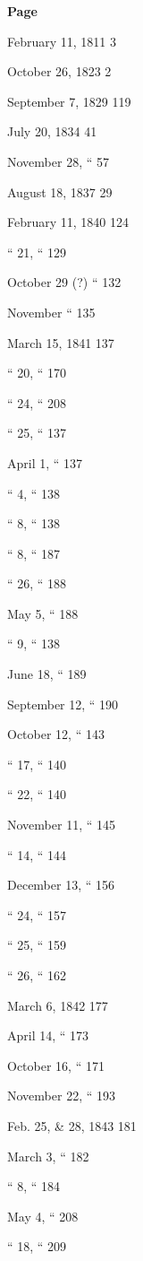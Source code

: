 

\textbf{Page}

February 11,
1811
3

October 26,
1823
2

September 7,
1829
119

July 20,
1834
41

November 28,
``
57

August 18,
1837
29

February 11,
1840
124

`` 21,
``
129

October 29 (?)
``
132

November
``
135

March 15,
1841
137

`` 20,
``
170

`` 24,
``
208

`` 25,
``
137

April 1,
``
137

`` 4,
``
138

`` 8,
``
138

`` 8,
``
187

`` 26,
``
188

May 5,
``
188

`` 9,
``
138

June 18,
``
189

September 12,
``
190

October 12,
``
143

`` 17,
``
140

`` 22,
``
140

November 11,
``
145

`` 14,
``
144

December 13,
``
156

`` 24,
``
157

`` 25,
``
159

`` 26,
``
162

March 6,
1842
177

April 14,
``
173

October 16,
``
171

November 22,
``
193

Feb. 25, \& 28,
1843
181

March 3,
``
182

``
8,
``
184

May 4,
``
208

`` 18,
``
209

